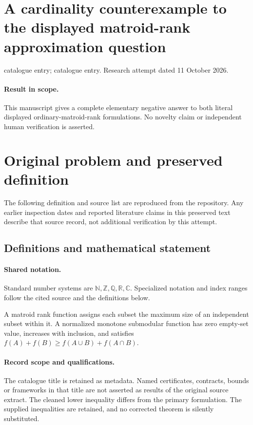 \documentclass[11pt]{article}
\begin{document}
\section*{A cardinality counterexample to the displayed matroid-rank approximation question}
\noindent catalogue entry; catalogue entry. Research attempt dated 11 October 2026.
\paragraph{Result in scope.}This manuscript gives a complete elementary negative answer to both literal displayed ordinary-matroid-rank formulations. No novelty claim or independent human verification is asserted.
\section{Original problem and preserved definition}
The following definition and source list are reproduced from the repository. Any earlier inspection dates and reported literature claims in this preserved text describe that source record, not additional verification by this attempt.
\subsection{Definitions and mathematical statement}

\paragraph{Shared notation.}Standard number systems are $\mathbb N,\mathbb Z,\mathbb Q,\mathbb R,\mathbb C$. Specialized notation and index ranges follow the cited source and the definitions below.


A matroid rank function assigns each subset the maximum size of an independent subset within it. A normalized monotone submodular function has zero empty-set value, increases with inclusion, and satisfies $f(A)+f(B)\geq f(A\cup B)+f(A\cap B)$.
\paragraph{Record scope and qualifications.}
The catalogue title is retained as metadata. Named certificates, contracts, bounds or frameworks in that title are not asserted as results of the original source extract.
The cleaned lower inequality differs from the primary formulation. The supplied inequalities are retained, and no corrected theorem is silently substituted.
\end{document}
